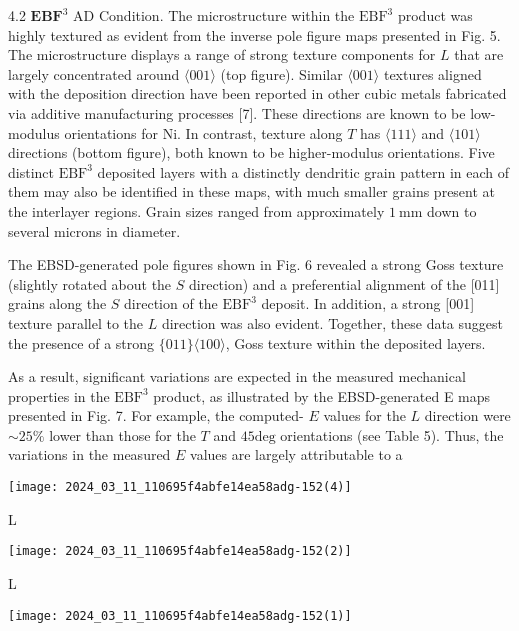 \documentclass[10pt]{article}
\begin{document}
4.2 $\mathbf{E B F}^{3}$ AD Condition. The microstructure within the $\mathrm{EBF}^{3}$ product was highly textured as evident from the inverse pole figure maps presented in Fig. 5. The microstructure displays a range of strong texture components for $L$ that are largely concentrated around $\langle 001\rangle$ (top figure). Similar $\langle 001\rangle$ textures aligned with the deposition direction have been reported in other cubic metals fabricated via additive manufacturing processes [7]. These directions are known to be low-modulus orientations for $\mathrm{Ni}$. In contrast, texture along $T$ has $\langle 111\rangle$ and $\langle 101\rangle$ directions (bottom figure), both known to be higher-modulus orientations. Five distinct $\mathrm{EBF}^{3}$ deposited layers with a distinctly dendritic grain pattern in each of them may also be identified in these maps, with much smaller grains present at the interlayer regions. Grain sizes ranged from approximately $1 \mathrm{~mm}$ down to several microns in diameter.

The EBSD-generated pole figures shown in Fig. 6 revealed a strong Goss texture (slightly rotated about the $S$ direction) and a preferential alignment of the [011] grains along the $S$ direction of the $\mathrm{EBF}^{3}$ deposit. In addition, a strong [001] texture parallel to the $L$ direction was also evident. Together, these data suggest the presence of a strong $\{011\}\langle 100\rangle$, Goss texture within the deposited layers.

As a result, significant variations are expected in the measured mechanical properties in the $\mathrm{EBF}^{3}$ product, as illustrated by the EBSD-generated E maps presented in Fig. 7. For example, the computed- $E$ values for the $L$ direction were $\sim 25 \%$ lower than those for the $T$ and $45 \mathrm{deg}$ orientations (see Table 5). Thus, the variations in the measured $E$ values are largely attributable to a

\begin{center}
\texttt{[image: 2024\_03\_11\_110695f4abfe14ea58adg-152(4)]}
\end{center}

L

\begin{center}
\texttt{[image: 2024\_03\_11\_110695f4abfe14ea58adg-152(2)]}
\end{center}

L

\begin{center}
\texttt{[image: 2024\_03\_11\_110695f4abfe14ea58adg-152(1)]}
\end{center}
\end{document}
